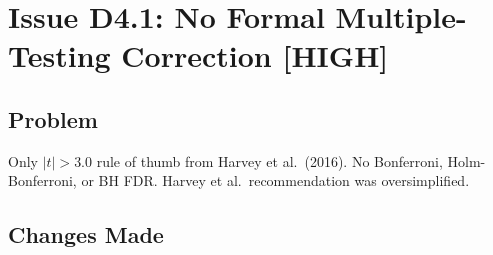 \documentclass[12pt,a4paper]{article}
\begin{document}
\section{Issue D4.1: No Formal Multiple-Testing Correction [HIGH]}

\subsection*{Problem}
Only $|t|>3.0$ rule of thumb from Harvey et al.\ (2016). No Bonferroni, Holm-Bonferroni, or BH FDR. Harvey et al.\ recommendation was oversimplified.

\subsection*{Changes Made}
\end{document}
